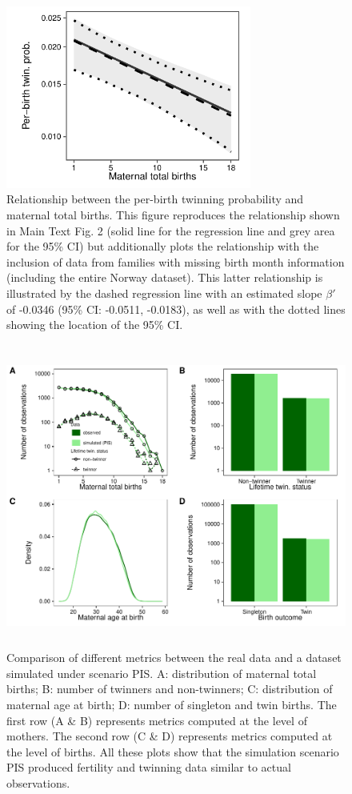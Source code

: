 \documentclass[a4paper]{article}\usepackage[]{graphicx}\usepackage[]{color}
\begin{document}
\begin{figure}[H]
\begin{center}
\includegraphics[height = 6cm]{../figures/figS5.pdf}
\end{center}
\caption{Relationship between the per-birth twinning probability and maternal total births. This figure reproduces the relationship shown in Main Text Fig. 2 (solid line for the regression line and grey area for the 95\% CI) but additionally plots the relationship with the inclusion of data from families with missing birth month information (including the entire Norway dataset). This latter relationship is illustrated by the dashed regression line with an estimated slope $\beta'$ of -0.0346 (95\% CI: -0.0511, -0.0183), as well as with the dotted lines showing the location of the 95\% CI.}
\end{figure}

\begin{figure}[H]
\begin{center}
\includegraphics[height = 10cm]{../figures/figS6.pdf}
\end{center}
\caption{Comparison of different metrics between the real data and a dataset simulated under scenario PIS. A: distribution of maternal total births; B: number of twinners and non-twinners; C: distribution of maternal age at birth; D: number of singleton and twin births. The first row (A \& B) represents metrics computed at the level of mothers. The second row (C \& D) represents metrics computed at the level of births. All these plots show that the simulation scenario PIS produced fertility and twinning data similar to actual observations.}
\end{figure}
\end{document}
